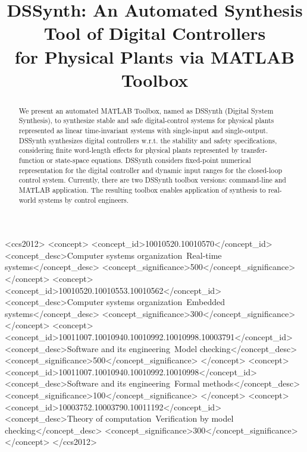 \documentclass[sigconf]{acmart}
\begin{document}
\title{DSSynth: An Automated Synthesis Tool of Digital Controllers \\ for Physical Plants via MATLAB Toolbox}

\begin{abstract}
We present an automated MATLAB Toolbox, named as DSSynth 
(Digital System Synthesis), to synthesize stable and safe digital-control 
systems for physical plants represented as linear time-invariant
systems with single-input and single-output. DSSynth synthesizes digital 
controllers w.r.t. the stability and safety specifications, considering finite word-length 
effects for physical plants represented by transfer-function or state-space 
equations. DSSynth considers fixed-point numerical representation for the 
digital controller and dynamic input ranges for the closed-loop control system. 
Currently, there are two DSSynth toolbox versions: command-line and 
MATLAB application. The resulting toolbox enables application of synthesis to 
real-world systems by control engineers.
\end{abstract}

%
%
\begin{CCSXML}
<ccs2012>
<concept>
<concept_id>10010520.10010570</concept_id>
<concept_desc>Computer systems organization~Real-time systems</concept_desc>
<concept_significance>500</concept_significance>
</concept>
<concept>
<concept_id>10010520.10010553.10010562</concept_id>
<concept_desc>Computer systems organization~Embedded systems</concept_desc>
<concept_significance>300</concept_significance>
</concept>
<concept>
<concept_id>10011007.10010940.10010992.10010998.10003791</concept_id>
<concept_desc>Software and its engineering~Model checking</concept_desc>
<concept_significance>500</concept_significance>
</concept>
<concept>
<concept_id>10011007.10010940.10010992.10010998</concept_id>
<concept_desc>Software and its engineering~Formal methods</concept_desc>
<concept_significance>100</concept_significance>
</concept>
<concept>
<concept_id>10003752.10003790.10011192</concept_id>
<concept_desc>Theory of computation~Verification by model checking</concept_desc>
<concept_significance>300</concept_significance>
</concept>
</ccs2012>
\end{CCSXML}

\end{document}
